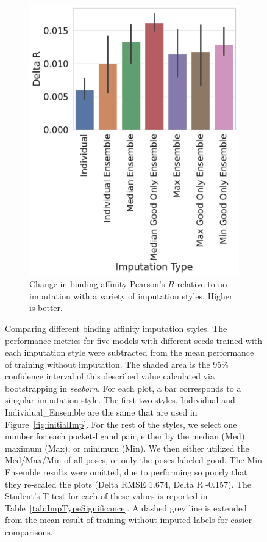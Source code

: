 \documentclass[journal=jcim,manuscript=article]{achemso}
\begin{document}
\begin{figure}[tbph]
    \hfill
    \begin{subfigure}[t]{0.48\textwidth}
        \centering
        \includegraphics[width=\linewidth]{figures/ComparingImpStylesR.pdf}
        \caption{Change in binding affinity Pearson's $R$ relative to no imputation with a variety of imputation styles. Higher is better.}
    \end{subfigure}

    \caption{Comparing different binding affinity imputation styles. The performance metrics for five models with different seeds trained with each imputation style were subtracted from the mean performance of training without imputation. The shaded area is the 95\% confidence interval of this described value calculated via bootstrapping in \textit{seaborn}. For each plot, a bar corresponds to a singular imputation style. The first two styles, Individual and Individual\_Ensemble are the same that are used in Figure~\ref{fig:initialImp}. For the rest of the styles, we select one number for each pocket-ligand pair, either by the median (Med), maximum (Max), or minimum (Min). We then either utilized the Med/Max/Min of all poses, or only the poses labeled good. The Min Ensemble results were omitted, due to performing so poorly that they re-scaled the plots (Delta RMSE 1.674, Delta R -0.157). The Student's T test for each of these values is reported in Table~\ref{tab:ImpTypeSignificance}. A dashed grey line is extended from the mean result of training without imputed labels for easier comparisons.}
    \label{fig:compareImp}
\end{figure}
\end{document}
